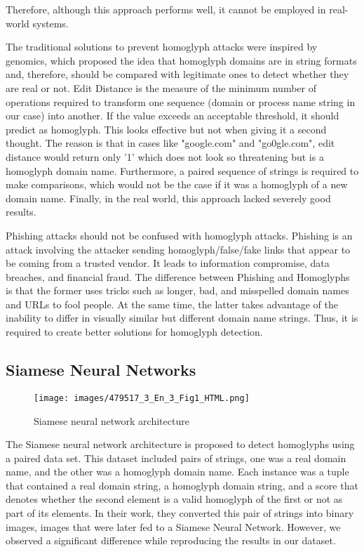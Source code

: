 \documentclass[letterpaper]{article} \usepackage{aaai22}  \usepackage{times}  \usepackage{helvet}  \usepackage{courier}  \usepackage[hyphens]{url}  \usepackage{graphicx} \urlstyle{rm} \def\UrlFont{\rm}  \usepackage{natbib}  \usepackage{caption} \DeclareCaptionStyle{ruled}{labelfont=normalfont,labelsep=colon,strut=off} \frenchspacing  \setlength{\pdfpagewidth}{8.5in}  \setlength{\pdfpageheight}{11in}  \usepackage{algorithm}
\begin{document}
Therefore, although this approach performs well, it cannot be employed in real-world systems. 

The traditional solutions to prevent homoglyph attacks were inspired by genomics\cite{lu2019homoglyph}, which proposed the idea that homoglyph domains are in string formats and, therefore, should be compared with legitimate ones to detect whether they are real or not. Edit Distance\cite{ristad1998learning} is the measure of the minimum number of operations required to transform one sequence (domain or process name string in our case) into another. If the value exceeds an acceptable threshold, it should predict as homoglyph. This looks effective but not when giving it a second thought. The reason is that in cases like "google.com" and "go0gle.com", edit distance would return only '1' which does not look so threatening but is a homoglyph domain name. Furthermore, a paired sequence of strings is required to make comparisons, which would not be the case if it was a homoglyph of a new domain name. Finally, in the real world, this approach lacked severely good results.

Phishing attacks\cite{hong2012state} should not be confused with homoglyph attacks. Phishing is an attack involving the attacker sending homoglyph/false/fake links that appear to be coming from a trusted vendor. It leads to information compromise\cite{helms2000risk}, data breaches\cite{cheng2017enterprise}, and financial fraud\cite{reurink2018financial}. The difference between Phishing and Homoglyphs is that the former uses tricks such as longer, bad, and misspelled domain names and URLs\cite{ma2009identifying} to fool people. At the same time, the latter takes advantage of the inability to differ in visually similar but different domain name strings. Thus, it is required to create better solutions for homoglyph detection.


\subsection{Siamese Neural Networks}
\begin{figure}
    \texttt{[image: images/479517\_3\_En\_3\_Fig1\_HTML.png]}
	\caption{Siamese neural network architecture\cite{woodbridge2018detecting}}
	\label{fig0}
\end{figure}

The Siamese neural network architecture is proposed to detect homoglyphs using a paired data set. This dataset included pairs of strings, one was a real domain name, and the other was a homoglyph domain name. Each instance was a tuple that contained a real domain string, a homoglyph domain string, and a score that denotes whether the second element is a valid homoglyph of the first or not as part of its elements. In their work, they converted this pair of strings into binary images, images that were later fed to a Siamese Neural Network. However, we observed a significant difference while reproducing the results in our dataset.
\end{document}
